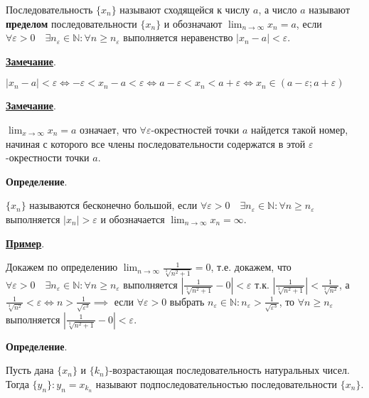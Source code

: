 \documentclass{article}
\newcommand{\parspace}{\vspace{10pt}}
\newcommand{\dslim}{\displaystyle\lim}
\newcommand{\dslimn}{\dslim_{n \to \infty}}
\begin{document}
Последовательность $\{x_n\}$ называют сходящейся к числу $a$, а число $a$ называют
\textbf{пределом} последовательности $\{x_n\}$ и обозначают 
$\displaystyle\lim_{n \rightarrow \infty} x_n = a$, если 
$\forall \varepsilon > 0 \quad \exists n_\varepsilon \in \mathbb{N}: \forall n \ge n_\varepsilon$
выполняется неравенство $|x_n - a| < \varepsilon$.

\parspace

\underline{\textbf{Замечание}}.

$|x_n - a| < \varepsilon \Leftrightarrow -\varepsilon < x_n - a < \varepsilon 
\Leftrightarrow a - \varepsilon < x_n < a + \varepsilon
\Leftrightarrow x_n \in (a - \varepsilon; a + \varepsilon)$

\parspace

\underline{\textbf{Замечание}}.

$\displaystyle\lim_{x \rightarrow \infty} x_n = a$ означает, что
$\forall \varepsilon$-окрестностей точки $a$ найдется такой номер, 
начиная с которого все члены последовательности содержатся в этой
$\varepsilon$-окрестности точки $a$.

\parspace

\textbf{Определение}.

$\{x_n\}$ называются бесконечно большой, если
$\forall \varepsilon > 0 \quad \exists n_\varepsilon \in \mathbb{N}:
\forall n \ge n_\varepsilon$ выполняется $|x_n| > \varepsilon$ и
обозначается $\dslimn x_n = \infty$.

\parspace

\underline{\textbf{Пример}}.

Докажем по определению 
$\dslimn \frac{1}{\sqrt[3]{n^2 + 1}} = 0$,
т.е. докажем, что $\forall \varepsilon > 0 \quad \exists n_\varepsilon \in \mathbb{N}:
\forall n \ge n_\varepsilon$ выполняется $\left|\frac{1}{\sqrt[3]{n^2 + 1}} - 0\right| < \varepsilon$
т.к. $\left|\frac{1}{\sqrt[3]{n^2 + 1}}\right| < \frac{1}{\sqrt[3]{n^2}}$,
а $\frac{1}{\sqrt[3]{n^2}} < \varepsilon \Leftrightarrow n > \frac{1}{\sqrt{\varepsilon^3}}
\implies$ если $\forall \varepsilon > 0$ выбрать 
$n_\varepsilon \in \mathbb{N}: n_\varepsilon > \frac{1}{\sqrt{\varepsilon^3}}$,
то $\forall n \ge n_\varepsilon$ выполняется $\left|\frac{1}{\sqrt[3]{n^2 + 1}} - 0\right| < \varepsilon$.

\parspace

\textbf{Определение}.

Пусть дана $\{x_n\}$ и $\{k_n\}$-возрастающая последовательность натуральных чисел.
Тогда $\{y_n\}: y_n = x_{k_n}$ называют подпоследовательностью последовательности $\{x_n\}$.
\end{document}
